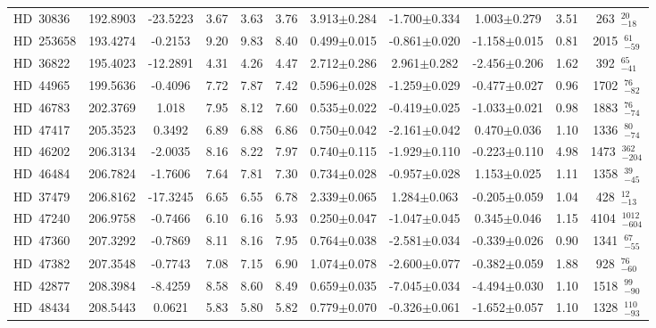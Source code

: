 {\begin{longtable}{lcccccccccc}
HD~30836 & 192.8903 & -23.5223 & 3.67 & 3.63 & 3.76 & 3.913$\pm$0.284 & -1.700$\pm$0.334 & 1.003$\pm$0.279 & 3.51 & 263~$_{-18}^{20}$ \\
\noalign{\smallskip}
HD~253658 & 193.4274 & -0.2153 & 9.20 & 9.83 & 8.40 & 0.499$\pm$0.015 & -0.861$\pm$0.020 & -1.158$\pm$0.015 & 0.81 & 2015~$_{-59}^{61}$ \\
\noalign{\smallskip}
HD~36822 & 195.4023 & -12.2891 & 4.31 & 4.26 & 4.47 & 2.712$\pm$0.286 & 2.961$\pm$0.282 & -2.456$\pm$0.206 & 1.62 & 392~$_{-41}^{65}$ \\
\noalign{\smallskip}
HD~44965 & 199.5636 & -0.4096 & 7.72 & 7.87 & 7.42 & 0.596$\pm$0.028 & -1.259$\pm$0.029 & -0.477$\pm$0.027 & 0.96 & 1702~$_{-82}^{76}$ \\
\noalign{\smallskip}
HD~46783 & 202.3769 & 1.018 & 7.95 & 8.12 & 7.60 & 0.535$\pm$0.022 & -0.419$\pm$0.025 & -1.033$\pm$0.021 & 0.98 & 1883~$_{-74}^{76}$ \\
\noalign{\smallskip}
HD~47417 & 205.3523 & 0.3492 & 6.89 & 6.88 & 6.86 & 0.750$\pm$0.042 & -2.161$\pm$0.042 & 0.470$\pm$0.036 & 1.10 & 1336~$_{-74}^{80}$ \\
\noalign{\smallskip}
HD~46202 & 206.3134 & -2.0035 & 8.16 & 8.22 & 7.97 & 0.740$\pm$0.115 & -1.929$\pm$0.110 & -0.223$\pm$0.110 & 4.98 & 1473~$_{-204}^{362}$ \\
\noalign{\smallskip}
HD~46484 & 206.7824 & -1.7606 & 7.64 & 7.81 & 7.30 & 0.734$\pm$0.028 & -0.957$\pm$0.028 & 1.153$\pm$0.025 & 1.11 & 1358~$_{-45}^{39}$ \\
\noalign{\smallskip}
HD~37479 & 206.8162 & -17.3245 & 6.65 & 6.55 & 6.78 & 2.339$\pm$0.065 & 1.284$\pm$0.063 & -0.205$\pm$0.059 & 1.04 & 428~$_{-13}^{12}$ \\
\noalign{\smallskip}
HD~47240 & 206.9758 & -0.7466 & 6.10 & 6.16 & 5.93 & 0.250$\pm$0.047 & -1.047$\pm$0.045 & 0.345$\pm$0.046 & 1.15 & 4104~$_{-604}^{1012}$ \\
\noalign{\smallskip}
HD~47360 & 207.3292 & -0.7869 & 8.11 & 8.16 & 7.95 & 0.764$\pm$0.038 & -2.581$\pm$0.034 & -0.339$\pm$0.026 & 0.90 & 1341~$_{-55}^{67}$ \\
\noalign{\smallskip}
HD~47382 & 207.3548 & -0.7743 & 7.08 & 7.15 & 6.90 & 1.074$\pm$0.078 & -2.600$\pm$0.077 & -0.382$\pm$0.059 & 1.88 & 928~$_{-60}^{76}$ \\
\noalign{\smallskip}
HD~42877 & 208.3984 & -8.4259 & 8.58 & 8.60 & 8.49 & 0.659$\pm$0.035 & -7.045$\pm$0.034 & -4.494$\pm$0.030 & 1.10 & 1518~$_{-90}^{99}$ \\
\noalign{\smallskip}
HD~48434 & 208.5443 & 0.0621 & 5.83 & 5.80 & 5.82 & 0.779$\pm$0.070 & -0.326$\pm$0.061 & -1.652$\pm$0.057 & 1.10 & 1328~$_{-93}^{110}$ \\

\end{longtable}}
